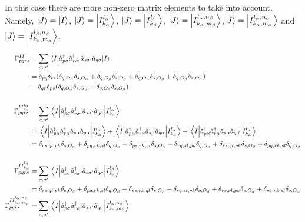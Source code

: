 \documentclass[11pt,a4paper]{article}
\newcommand{\kron}[1]{\delta_{#1}}
\newcommand{\oa}{O_{\alpha}}
\newcommand{\ob}{O_{\beta}}
\begin{document}
In this case there are more non-zero matrix elements to take into account. Namely, $\ket{J}=\ket{I}$, $\ket{J}=\ket{I_{k_\alpha}^{l_\alpha}}$, $\ket{J}=\ket{I_{k_\beta}^{l_\beta}}$, $\ket{J}=\ket{I_{k_\alpha,m_\beta}^{l_\alpha,n_\beta}}$,$\ket{J}=\ket{I_{k_\alpha,m_\alpha}^{l_\alpha,n_\alpha}}$ and $\ket{J}=\ket{I_{k_\beta,m_\beta}^{l_\beta,n_\beta}}$.

\begin{subequations}
  \label{eq:2RDM_nonzero}
  \begin{align}
    \Gamma_{pqrs}^{II} &= \sum_{\sigma,\sigma'}\mel{I}{\hat{a}_{p\sigma}^\dagger\hat{a}_{r\sigma'}^\dagger\hat{a}_{s\sigma'}\hat{a}_{q\sigma}}{I} \\
                       &= \delta_{pq}\delta_{rs}(\delta_{q,\oa} \delta_{s,\oa} + \delta_{q,\ob} \delta_{s,\ob}+ \delta_{q,\oa} \delta_{s,\ob} + \delta_{q,\ob} \delta_{s,\oa})\\
    &-\delta_{qr}\delta_{ps} (\delta_{q,\oa} \delta_{s,\oa} + \delta_{q,\ob} \delta_{s,\ob}) \notag \\
    \notag \\
    \Gamma_{pqrs}^{II_{k_\alpha}^{l_\alpha}} &= \sum_{\sigma,\sigma'}\mel{I}{\hat{a}_{p\sigma}^\dagger\hat{a}_{r\sigma'}^\dagger\hat{a}_{s\sigma'}\hat{a}_{q\sigma}}{I_{k_\alpha}^{l_\alpha}} \\
                       &=\mel{I}{\hat{a}_{p\alpha}^\dagger\hat{a}_{r\alpha}^\dagger\hat{a}_{s\alpha}\hat{a}_{q\alpha}}{I_{k_\alpha}^{l_\alpha}} + \mel{I}{\hat{a}_{p\alpha}^\dagger\hat{a}_{r\beta}^\dagger\hat{a}_{s\beta}\hat{a}_{q\alpha}}{I_{k_\alpha}^{l_\alpha}} + \mel{I}{\hat{a}_{p\beta}^\dagger\hat{a}_{r\alpha}^\dagger\hat{a}_{s\alpha}\hat{a}_{q\beta}}{I_{k_\alpha}^{l_\alpha}} \notag\\
                       &= \kron{rs,ql,pk}\kron{s,\oa}+\kron{pq,rk,sl}\kron{q,\oa}-\kron{ps,rk,ql}\kron{s,\oa}-\kron{rq,sl,pk}\kron{q,\oa} + \kron{rs,ql,pk}\kron{s,\ob} + \kron{pq,rk,sl}\kron{q,\ob} \notag\\
    \notag \\
    \Gamma_{pqrs}^{II_{k_\beta}^{l_\beta}} &= \sum_{\sigma,\sigma'}\mel{I}{\hat{a}_{p\sigma}^\dagger\hat{a}_{r\sigma'}^\dagger\hat{a}_{s\sigma'}\hat{a}_{q\sigma}}{I_{k_\beta}^{l_\beta}} \\
                       &= \kron{rs,ql,pk}\kron{s,\ob}+\kron{pq,rk,sl}\kron{q,\ob}-\kron{ps,rk,ql}\kron{s,\ob}-\kron{rq,sl,pk}\kron{q,\ob} + \kron{rs,ql,pk}\kron{s,\oa} + \kron{pq,rk,sl}\kron{q,\oa} \notag\\
    \Gamma_{pqrs}^{II_{k_\alpha,m_\beta}^{l_\alpha,n_\beta}} &= \sum_{\sigma,\sigma'}\mel{I}{\hat{a}_{p\sigma}^\dagger\hat{a}_{r\sigma'}^\dagger\hat{a}_{s\sigma'}\hat{a}_{q\sigma}}{I_{k_\alpha,m_\beta}^{l_\alpha,n_\beta}} \\

\end{align}
\end{subequations}
\end{document}

